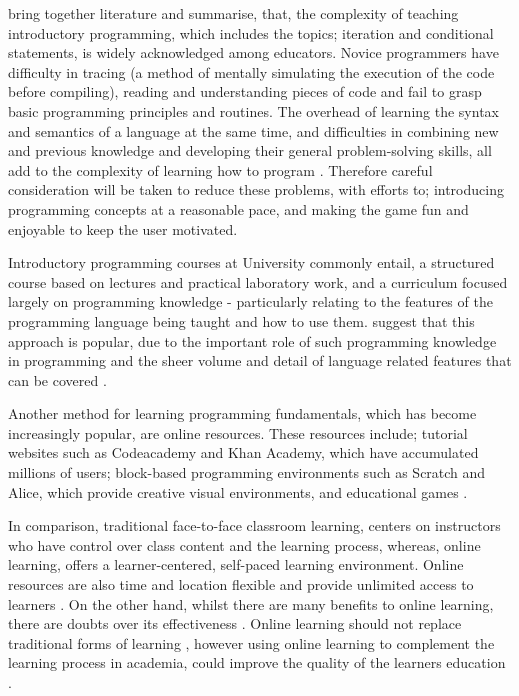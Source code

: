 \documentclass[a4paper,11.5pt]{report}
\numberwithin{figure}{section}
\numberwithin{table}{section}
\numberwithin{equation}{section}
\numberwithin{equation}{section}
\begin{document}
\citeauthor{Koulouri2014} bring together literature and summarise, that, the complexity of teaching introductory programming, which includes the topics; iteration and conditional statements, is widely acknowledged among educators. Novice programmers have difficulty in tracing (a method of mentally simulating the execution of the code before compiling), reading and understanding pieces of code and fail to grasp basic programming principles and routines. The overhead of learning the syntax and semantics of a language at the same time, and difficulties in combining new and previous knowledge and developing their general problem-solving skills, all add to the complexity of learning how to program \citep{Koulouri2014}. Therefore careful consideration will be taken to reduce these problems, with efforts to; introducing programming concepts at a reasonable pace, and making the game fun and enjoyable to keep the user motivated. %

Introductory programming courses at University commonly entail, a structured course based on lectures and practical laboratory work, and a curriculum focused largely on programming knowledge - particularly relating to the features of the programming language being taught and how to use them. \citeauthor{Robins2003} suggest that this approach is popular, due to the important role of such programming knowledge in programming and the sheer volume and detail of language related features that can be covered \citep{Robins2003}.

Another method for learning programming fundamentals, which has become increasingly popular, are online resources. These resources include; tutorial websites such as Codeacademy and Khan Academy, which have accumulated millions of users; block-based programming environments such as Scratch and Alice, which provide creative visual environments, and educational games \citep{Lee2015}. 

In comparison, traditional face-to-face classroom learning, centers on instructors who have control over class content and the learning process, whereas, online learning, offers a learner-centered, self-paced learning environment. Online resources are also time and location flexible and provide unlimited access to learners \citep{Zhang2004}. On the other hand, whilst there are many benefits to online learning, there are doubts over its effectiveness \citep{Zhang2004}. Online learning should not replace traditional forms of learning \citep{Zhang2004, Gunasekaran2002, agal2010}, however using online learning to complement the learning process in academia, could improve the quality of the learners education \citep{Concannon2005, Zhang2004}.
\end{document}
